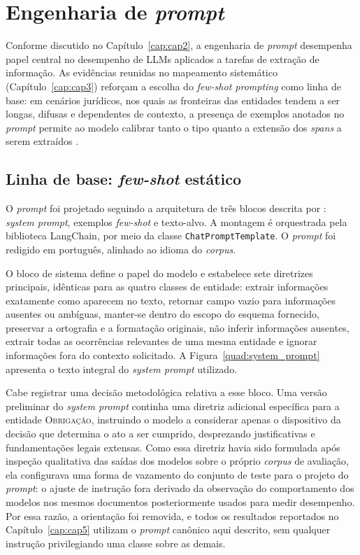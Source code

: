 \section{Engenharia de \textit{prompt}}
\label{sec:prompting}

Conforme discutido no Capítulo~\ref{cap:cap2}, a engenharia de \textit{prompt} desempenha papel central no desempenho de LLMs aplicados a tarefas de extração de informação. As evidências reunidas no mapeamento sistemático (Capítulo~\ref{cap:cap3}) reforçam a escolha do \textit{few-shot prompting} como linha de base: em cenários jurídicos, nos quais as fronteiras das entidades tendem a ser longas, difusas e dependentes de contexto, a presença de exemplos anotados no \textit{prompt} permite ao modelo calibrar tanto o tipo quanto a extensão dos \textit{spans} a serem extraídos \cite{Tang2024,schulhoff2025promptreport}.

\subsection{Linha de base: \textit{few-shot} estático}
\label{sec:fewshot_baseline}

O \textit{prompt} foi projetado seguindo a arquitetura de três blocos descrita por : \textit{system prompt}, exemplos \textit{few-shot} e texto-alvo. A montagem é orquestrada pela biblioteca LangChain, por meio da classe \texttt{ChatPromptTemplate}. O \textit{prompt} foi redigido em português, alinhado ao idioma do \textit{corpus}.

O bloco de sistema define o papel do modelo e estabelece sete diretrizes principais, idênticas para as quatro classes de entidade: extrair informações exatamente como aparecem no texto, retornar campo vazio para informações ausentes ou ambíguas, manter-se dentro do escopo do esquema fornecido, preservar a ortografia e a formatação originais, não inferir informações ausentes, extrair todas as ocorrências relevantes de uma mesma entidade e ignorar informações fora do contexto solicitado. A Figura~\ref{quad:system_prompt} apresenta o texto integral do \textit{system prompt} utilizado.

Cabe registrar uma decisão metodológica relativa a esse bloco. Uma versão preliminar do \textit{system prompt} continha uma diretriz adicional específica para a entidade \textsc{Obrigação}, instruindo o modelo a considerar apenas o dispositivo da decisão que determina o ato a ser cumprido, desprezando justificativas e fundamentações legais extensas. Como essa diretriz havia sido formulada após inspeção qualitativa das saídas dos modelos sobre o próprio \textit{corpus} de avaliação, ela configurava uma forma de vazamento do conjunto de teste para o projeto do \textit{prompt}: o ajuste de instrução fora derivado da observação do comportamento dos modelos nos mesmos documentos posteriormente usados para medir desempenho. Por essa razão, a orientação foi removida, e todos os resultados reportados no Capítulo~\ref{cap:cap5} utilizam o \textit{prompt} canônico aqui descrito, sem qualquer instrução privilegiando uma classe sobre as demais.

